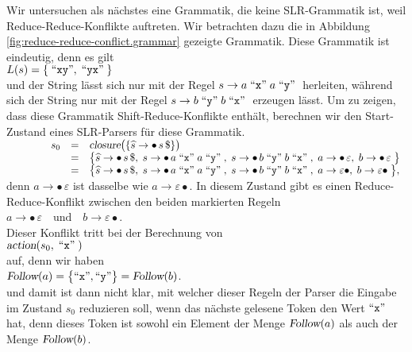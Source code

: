 Wir untersuchen als n\"achstes eine Grammatik, die keine SLR-Grammatik ist, weil
Reduce-Reduce-Konflikte auftreten.  
Wir betrachten dazu die in Abbildung \ref{fig:reduce-reduce-conflict.grammar}
gezeigte Grammatik.   Diese Grammatik ist eindeutig, denn es gilt
\\[0.2cm]
\hspace*{1.3cm}
$L(s) = \{\; \mbox{``\texttt{xy}''}, \;\mbox{``\texttt{yx}''} \;\}$
\\[0.2cm]
und der String  l\"asst sich nur mit der Regel $s \rightarrow  a \;\mbox{``\texttt{x}''}\; a \;\mbox{``\texttt{y}''}\;$
herleiten, w\"ahrend sich der String  nur mit der Regel 
$s \rightarrow b \;\mbox{``\texttt{y}''}\; b \;\mbox{``\texttt{x}''}\;$ erzeugen l\"asst.
Um zu zeigen, dass diese Grammatik Shift-Reduce-Konflikte enth\"alt,
berechnen wir den Start-Zustand eines SLR-Parsers f\"ur diese Grammatik.
\\[0.2cm]
$\hspace*{1.3cm}
\begin{array}[t]{lcl}
 s_0 & = & \textsl{closure}\bigl( \{ \widehat{s} \rightarrow \bullet\, s\,\symbol{36} \}\bigr) \\
     & = & \bigl\{ \widehat{s} \rightarrow \bullet\, s\,\symbol{36},\;
                   s \rightarrow \bullet\, a \quoted{x} a \quoted{y},\;
                   s \rightarrow \bullet\, b \quoted{y} b \quoted{x},\;
                   a \rightarrow \bullet\, \varepsilon, \;
                   b \rightarrow \bullet\, \varepsilon \;
            \bigr\} \\
     & = & \bigl\{ \widehat{s} \rightarrow \bullet\, s\,\symbol{36},\;
                   s \rightarrow \bullet\, a \quoted{x} a \quoted{y},\;
                   s \rightarrow \bullet\, b \quoted{y} b \quoted{x},\;
                   a \rightarrow \varepsilon \bullet, \;
                   b \rightarrow \varepsilon \bullet \;
            \bigr\},
 \end{array}
$
\\[0.2cm] 
denn $a \rightarrow \bullet\, \varepsilon$ ist dasselbe wie $a \rightarrow \varepsilon \bullet$.
In diesem Zustand gibt es einen Reduce-Reduce-Konflikt zwischen den beiden markierten Regeln
\\[0.2cm]
\hspace*{1.3cm}
$a \rightarrow \bullet\, \varepsilon \quad \mbox{und} \quad b \rightarrow \varepsilon \bullet$.
\\[0.2cm]
Dieser Konflikt tritt bei der Berechnung von 
\\[0.2cm]
\hspace*{1.3cm}
$\textsl{action}(s_0, \;\mbox{``\texttt{x}''}\;)$
\\[0.2cm]
auf, denn wir haben 
\\[0.2cm]
\hspace*{1.3cm}
$\textsl{Follow}(a) = \bigl\{ \mbox{``\texttt{x}''}, \mbox{``\texttt{y}''} \bigr\} = \textsl{Follow}(b)$.
\\[0.2cm]
und damit ist dann nicht klar, mit welcher dieser Regeln der Parser die Eingabe im Zustand $s_0$
reduzieren soll, wenn das n\"achste gelesene Token den Wert $\mbox{``\texttt{x}''}$ hat, denn dieses Token ist
sowohl ein Element der Menge $\textsl{Follow}(a)$ als auch der Menge $\textsl{Follow}(b)$.

